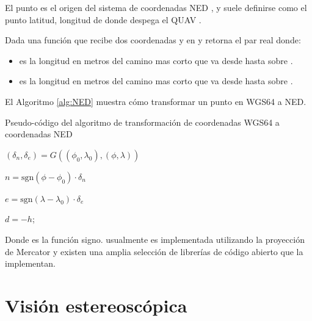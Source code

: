 El punto  es el origen del sistema de coordenadas NED \cite{cai2011coordinate}, y suele definirse como el punto latitud, longitud de donde despega el QUAV \cite{multidrone2017review}.

Dada  una función que recibe dos coordenadas  y  en  y retorna el par real  donde: 

\begin{itemize}
    \item {} es la longitud en metros del camino mas corto que va desde  hasta  sobre .
    \item {} es la longitud en metros del camino mas corto que va desde  hasta  sobre .
\end{itemize}

El Algoritmo \ref{alg:NED} muestra cómo transformar un punto  en WGS64 a NED.

\begin{algorithm}
\caption{Pseudo-código del algoritmo de transformación de coordenadas WGS64 a coordenadas NED}
\label{alg:NED}

$(\delta_n, \delta_e) = G((\phi_0, \lambda_0), (\phi, \lambda))$

$n = \text{sgn}(\phi - \phi_0) \cdot \delta_n$

$e = \text{sgn}(\lambda - \lambda_0) \cdot \delta_e$

$d = -h$;


\end{algorithm}


Donde  es la función signo.  usualmente es implementada utilizando la proyección de Mercator \cite{vis2018history} y existen una amplia selección de librerías de código abierto que la implementan.

\section{Visión estereoscópica}
\label{sec:teo-stereo}

